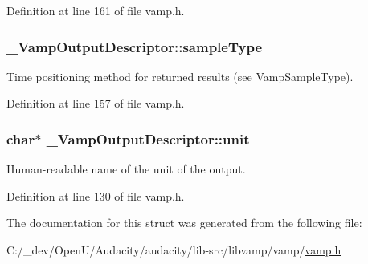 Definition at line 161 of file vamp.\+h.

\subsubsection[{\texorpdfstring{sample\+Type}{sampleType}}]{ \+\_\+\+Vamp\+Output\+Descriptor\+::sample\+Type}\hypertarget{struct___vamp_output_descriptor_a5da1d27cc99badc214640e859b882072}{}\label{struct___vamp_output_descriptor_a5da1d27cc99badc214640e859b882072}
Time positioning method for returned results (see Vamp\+Sample\+Type). 

Definition at line 157 of file vamp.\+h.

\subsubsection[{\texorpdfstring{unit}{unit}}]{ char$\ast$ \+\_\+\+Vamp\+Output\+Descriptor\+::unit}\hypertarget{struct___vamp_output_descriptor_ad038caa8e596dfd037035637202f1d63}{}\label{struct___vamp_output_descriptor_ad038caa8e596dfd037035637202f1d63}
Human-\/readable name of the unit of the output. 

Definition at line 130 of file vamp.\+h.



The documentation for this struct was generated from the following file\+:\begin{DoxyCompactItemize}
\item 
C\+:/\+\_\+dev/\+Open\+U/\+Audacity/audacity/lib-\/src/libvamp/vamp/\hyperlink{vamp_8h}{vamp.\+h}\end{DoxyCompactItemize}
